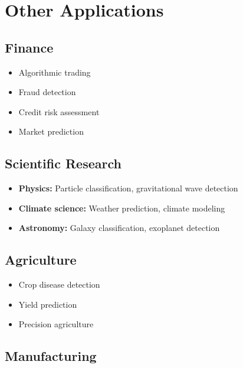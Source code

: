 
\section{Other Applications }
\label{sec:other-applications}

\subsection{Finance}

\begin{itemize}
    \item Algorithmic trading
    \item Fraud detection
    \item Credit risk assessment
    \item Market prediction
\end{itemize}

\subsection{Scientific Research}

\begin{itemize}
    \item \textbf{Physics:} Particle classification, gravitational wave detection
    \item \textbf{Climate science:} Weather prediction, climate modeling
    \item \textbf{Astronomy:} Galaxy classification, exoplanet detection
\end{itemize}

\subsection{Agriculture}

\begin{itemize}
    \item Crop disease detection
    \item Yield prediction
    \item Precision agriculture
\end{itemize}

\subsection{Manufacturing}


